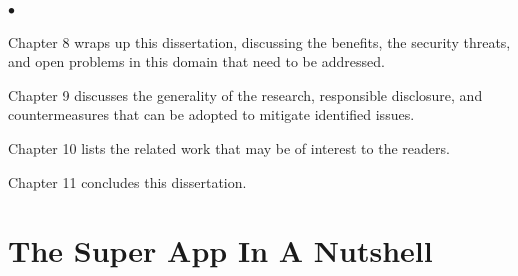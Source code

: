 \documentclass{osudissert96}
\renewenvironment{itemize}{
\begin{list}{$\bullet$}{
\setlength{\labelwidth}{8pt}
\setlength{\itemsep}{0pt}
\setlength{\leftmargin}{\labelwidth}
\addtolength{\leftmargin}{\labelsep}
\setlength{\parindent}{0pt}
\setlength{\listparindent}{\parindent}
\setlength{\parsep}{2pt}
\setlength{\topsep}{1pt}}}{\end{list}}
\begin{document}
\begin{itemize}
  \item Chapter 8 wraps up this dissertation, discussing the benefits, the security threats, and open problems in this domain that need to be addressed.
  \item Chapter 9 discusses the generality of the research, responsible disclosure, and countermeasures that can be adopted to mitigate identified issues.
  \item Chapter 10 lists the related work that may be of interest to the readers.
  \item Chapter 11 concludes this dissertation.
\end{itemize}








\chapter{The Super App In A Nutshell}




\end{document}
